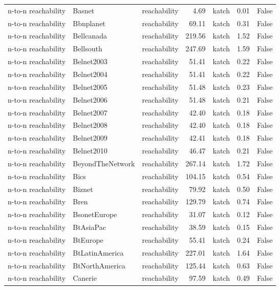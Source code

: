 \begin{tabular}{lllrlrr}
n-to-n reachability & Basnet & reachability & 4.69 & katch & 0.01 & False \\
n-to-n reachability & Bbnplanet & reachability & 69.11 & katch & 0.31 & False \\
n-to-n reachability & Bellcanada & reachability & 219.56 & katch & 1.52 & False \\
n-to-n reachability & Bellsouth & reachability & 247.69 & katch & 1.59 & False \\
n-to-n reachability & Belnet2003 & reachability & 51.41 & katch & 0.22 & False \\
n-to-n reachability & Belnet2004 & reachability & 51.41 & katch & 0.22 & False \\
n-to-n reachability & Belnet2005 & reachability & 51.48 & katch & 0.23 & False \\
n-to-n reachability & Belnet2006 & reachability & 51.48 & katch & 0.21 & False \\
n-to-n reachability & Belnet2007 & reachability & 42.40 & katch & 0.18 & False \\
n-to-n reachability & Belnet2008 & reachability & 42.40 & katch & 0.18 & False \\
n-to-n reachability & Belnet2009 & reachability & 42.41 & katch & 0.18 & False \\
n-to-n reachability & Belnet2010 & reachability & 46.47 & katch & 0.21 & False \\
n-to-n reachability & BeyondTheNetwork & reachability & 267.14 & katch & 1.72 & False \\
n-to-n reachability & Bics & reachability & 104.15 & katch & 0.54 & False \\
n-to-n reachability & Biznet & reachability & 79.92 & katch & 0.50 & False \\
n-to-n reachability & Bren & reachability & 129.79 & katch & 0.74 & False \\
n-to-n reachability & BsonetEurope & reachability & 31.07 & katch & 0.12 & False \\
n-to-n reachability & BtAsiaPac & reachability & 38.59 & katch & 0.15 & False \\
n-to-n reachability & BtEurope & reachability & 55.41 & katch & 0.24 & False \\
n-to-n reachability & BtLatinAmerica & reachability & 227.01 & katch & 1.64 & False \\
n-to-n reachability & BtNorthAmerica & reachability & 125.44 & katch & 0.63 & False \\
n-to-n reachability & Canerie & reachability & 97.59 & katch & 0.49 & False \\

\end{tabular}
